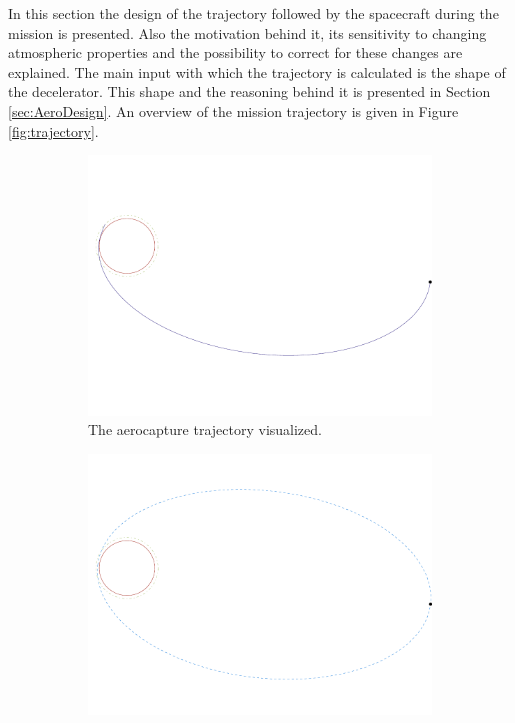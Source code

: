 In this section the design of the trajectory followed by the spacecraft during the mission is presented. Also the motivation behind it, its sensitivity to changing atmospheric properties and the possibility to correct for these changes are explained. The main input with which the trajectory is calculated is the shape of the decelerator. This shape and the reasoning behind it is presented in Section \ref{sec:AeroDesign}. An overview of the mission trajectory is given in Figure \ref{fig:trajectory}.

\begin{figure}
	\centering
	
	\begin{subfigure}[b]{0.7\textwidth}
		\vspace{-22mm}
		\includegraphics[width=\textwidth]{./Figure/Orbit/aerocapture_trajectory.pdf}
		\vspace{-25mm}
		\caption{The aerocapture trajectory visualized.}
		\label{fig:capture_trajectory}
	\end{subfigure}
	\begin{subfigure}[b]{0.7\textwidth}
		\vspace{-10mm}
		\includegraphics[width=\textwidth]{./Figure/Orbit/parking_trajectory.pdf}

\end{subfigure}
\end{figure}
